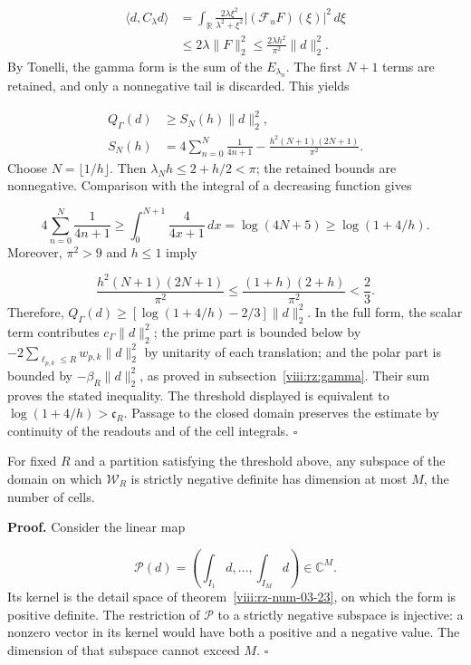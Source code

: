 \[
\begin{aligned}
\langle d,C_\lambda d\rangle
&=\int_{\mathbb R}
\frac{2\lambda\xi^2}{\lambda^2+\xi^2}
|(\mathcal F_u F)(\xi)|^2\,d\xi\\
&\leq2\lambda\|F\|_2^2
\leq\frac{2\lambda h^2}{\pi^2}\|d\|_2^2.
\end{aligned}
\]
By Tonelli, the gamma form is the sum of the \(E_{\lambda_n}\). The first \(N+1\) terms are retained, and only a nonnegative tail is discarded. This yields

\[
\begin{aligned}
Q_\Gamma(d)&\geq S_N(h)\|d\|_2^2,\\
S_N(h)&=4\sum_{n=0}^N\frac1{4n+1}
-\frac{h^2(N+1)(2N+1)}{\pi^2}.
\end{aligned}
\]
Choose \(N=\lfloor1/h\rfloor\). Then \(\lambda_N h\leq2+h/2<\pi\); the retained bounds are nonnegative. Comparison with the integral of a decreasing function gives

\[
4\sum_{n=0}^N\frac1{4n+1}
\geq\int_0^{N+1}\frac4{4x+1}\,dx
=\log(4N+5)\geq\log(1+4/h).
\]
Moreover, \(\pi^2>9\) and
\(h\leq1\) imply

\[
\frac{h^2(N+1)(2N+1)}{\pi^2}
\leq\frac{(1+h)(2+h)}{\pi^2}<\frac23.
\]
Therefore, \(Q_\Gamma(d)\geq[\log(1+4/h)-2/3]\|d\|_2^2\). In the full form, the scalar term contributes \(c_\Gamma\|d\|_2^2\); the prime part is bounded below by \(-2\sum_{\ell_{p,k}\leq R}w_{p,k}\|d\|_2^2\) by unitarity of each translation; and the polar part is bounded by \(-\beta_R\|d\|_2^2\), as proved in subsection~\ref{viii:rz:gamma}. Their sum proves the stated inequality. The threshold displayed is equivalent to \(\log(1+4/h)>\mathfrak c_R\). Passage to the closed domain preserves the estimate by continuity of the readouts and of the cell integrals. \hfill\(\square\)

For fixed \(R\) and a partition satisfying the threshold above, any subspace of the domain on which \(\mathscr W_R\) is strictly negative definite has dimension at most \(M\), the number of cells.

\textbf{Proof.} Consider the linear map

\[
\mathcal P(d)=\left(\int_{I_1}d,\ldots,
\int_{I_M}d\right)\in\mathbb C^M.
\]
Its kernel is the detail space of theorem~\ref{viii:rz-num-03-23}, on which the form is positive definite. The restriction of \(\mathcal P\) to a strictly negative subspace is injective: a nonzero vector in its kernel would have both a positive and a negative value. The dimension of that subspace cannot exceed \(M\). \hfill\(\square\)

